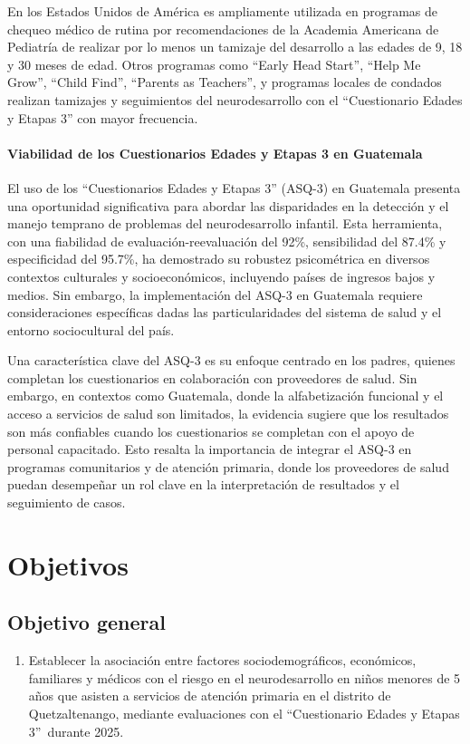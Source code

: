 \documentclass[11pt,letterpaper]{report}
\newcommand{\asq}{“Cuestionario Edades y Etapas 3”}
\begin{document}
En los Estados Unidos de América es ampliamente utilizada en programas de
chequeo médico de rutina por recomendaciones de la Academia Americana de
Pediatría de realizar por lo menos un tamizaje del desarrollo a las edades de
9, 18 y 30 meses de edad. Otros programas como ``Early Head Start'', ``Help Me
Grow'', ``Child Find'', ``Parents as Teachers'', y programas locales de
condados realizan tamizajes y seguimientos del neurodesarrollo con el
``Cuestionario Edades y Etapas 3'' con mayor frecuencia. \cite{ASQWorld}

\subsubsection{Viabilidad de los Cuestionarios Edades y Etapas 3 en Guatemala}
El uso de los ``Cuestionarios Edades y Etapas 3'' (ASQ-3) en Guatemala presenta
una oportunidad significativa para abordar las disparidades en la detección y
el manejo temprano de problemas del neurodesarrollo infantil. Esta herramienta,
con una fiabilidad de evaluación-reevaluación del 92\%, sensibilidad del 87.4\%
y especificidad del 95.7\%, ha demostrado su robustez psicométrica en diversos
contextos culturales y socioeconómicos, incluyendo países de ingresos bajos y
medios. Sin embargo, la implementación del ASQ-3 en Guatemala requiere
consideraciones específicas dadas las particularidades del sistema de salud y
el entorno sociocultural del país. \cite{Vameghi2013-uo, Manasyan2023}

Una característica clave del ASQ-3 es su enfoque centrado en los padres,
quienes completan los cuestionarios en colaboración con proveedores de salud.
Sin embargo, en contextos como Guatemala, donde la alfabetización funcional y
el acceso a servicios de salud son limitados, la evidencia sugiere que los
resultados son más confiables cuando los cuestionarios se completan con el
apoyo de personal capacitado. Esto resalta la importancia de integrar el ASQ-3
en programas comunitarios y de atención primaria, donde los proveedores de
salud puedan desempeñar un rol clave en la interpretación de resultados y el
seguimiento de casos. \cite{Manasyan2023, Colbert2021}

	\chapter{Objetivos}
\section{Objetivo general}
	\begin{enumerate}
		\item Establecer la asociación entre factores sociodemográficos,
		económicos, familiares y médicos con el riesgo en el neurodesarrollo en
		niños menores de 5 años que asisten a servicios de atención primaria en
		el distrito de Quetzaltenango, mediante evaluaciones con el \asq\
		durante 2025.
	\end{enumerate}
\end{document}
